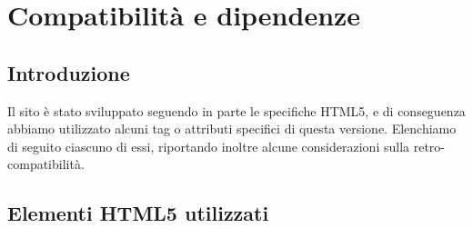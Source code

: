 \documentclass[12pt]{article}
\begin{document}
	\section{Compatibilità e dipendenze}
	\subsection{Introduzione}
	Il sito è stato sviluppato seguendo in parte le specifiche HTML5, e di conseguenza abbiamo utilizzato alcuni tag o attributi specifici di questa versione. Elenchiamo di seguito ciascuno di essi, riportando inoltre alcune considerazioni sulla retro-compatibilità.
	
	\subsection{Elementi HTML5 utilizzati}
\end{document}
